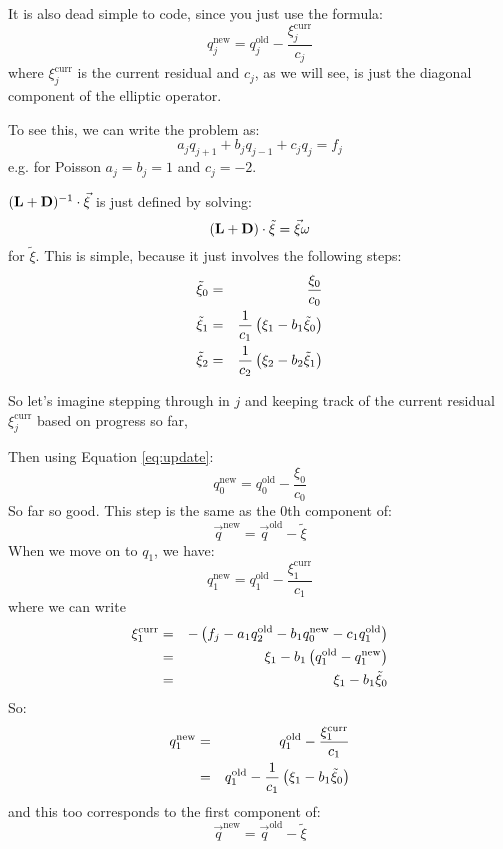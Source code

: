 It is also dead simple to code, since you just use the formula:
\begin{equation}
\label{eq:update}
q_j^{\mathrm{new}} = q_j^{\mathrm{old}}
- \frac{\xi_j^{\mathrm{curr}}}{c_j}
\end{equation}
where $\xi_j^{\mathrm{curr}}$ is the current residual and $c_j$, as we
will see, is just the diagonal component of the elliptic operator.
 
To see this, we can write the problem as:
\begin{equation}
a_j q_{j+1} + b_j q_{j-1} + c_j q_j = f_j
\end{equation}
e.g. for Poisson $a_j=b_j =1$ and $c_j=-2$. 

$({\bf L}+{\bf D})^{-1} \cdot \vec{\xi}$ is just defined by solving:
\begin{equation}
({\bf L} + {\bf D}) \cdot \tilde\xi = \vec{\xi} \omega
\end{equation}
for $\tilde\xi$. This is simple, because it just
involves the following steps:
\begin{eqnarray}
\tilde\xi_0 &=& \frac{\xi_0}{c_0} \cr
\tilde\xi_1 &=& \frac{1}{c_1} \left(\xi_1 - b_1 \tilde\xi_0\right)\cr
\tilde\xi_2 &=& \frac{1}{c_2} \left(\xi_2 - b_2 \tilde\xi_1\right)
\end{eqnarray}

So let's imagine stepping through in $j$ and keeping track of the
current residual $\xi_j^{\mathrm{curr}}$ based on progress so far,

Then using Equation \ref{eq:update}:
\begin{equation}
q_0^{\mathrm{new}} = q_0^{\mathrm{old}} - \frac{\xi_0}{c_0}
\end{equation}
So far so good. This step is the same as the 0th component of:
\begin{equation}
\vec{q}^{\mathrm{new}} = \vec{q}^{\mathrm{old}}
- \tilde\xi
\end{equation}
When we move on to $q_1$, we have:
\begin{equation}
q_1^{\mathrm{new}} = q_1^{\mathrm{old}}
- \frac{\xi_1^{\mathrm{curr}}}{c_1}
\end{equation}
where we can write
\begin{eqnarray}
\xi_1^{\mathrm{curr}} &=& - \left(f_j - a_1 q_2^{\mathrm{old}} - b_1
q_0^{\mathrm{new}} - c_1 q_1^{\mathrm{old}}\right) \cr
&=& \xi_1 - b_1 \left(q_1^{\mathrm{old}} -
q_1^{\mathrm{new}}\right) \cr
&=& \xi_1 - b_1 \tilde\xi_0
\end{eqnarray}
So:
\begin{eqnarray}
q_1^{\mathrm{new}} &=& q_1^{\mathrm{old}}
- \frac{\xi_1^{\mathrm{curr}}}{c_1} \cr
&=& q_1^{\mathrm{old}} - \frac{1}{c_1} \left(\xi_1
- b_1 \tilde\xi_0\right)
\end{eqnarray}
and this too corresponds to the first component of: 
\begin{equation}
\vec{q}^{\mathrm{new}} = \vec{q}^{\mathrm{old}}
- \tilde\xi
\end{equation}

